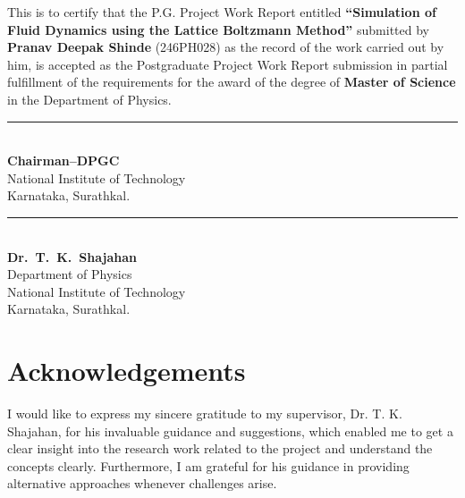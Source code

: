 \documentclass[12pt, a4paper]{report}
\begin{document}
\vspace{1.2cm}

\noindent
This is to certify that the P.G. Project Work Report entitled
\textbf{``Simulation of Fluid Dynamics using the Lattice Boltzmann Method''}
submitted by \textbf{Pranav Deepak Shinde} (246PH028) as the record of the work
carried out by him, is accepted as the Postgraduate Project Work Report
submission in partial fulfillment of the requirements for the award of the
degree of \textbf{Master of Science} in the Department of Physics.

\vspace{3.5cm}

\noindent
\begin{minipage}[t]{0.45\textwidth}
\centering
\rule{6cm}{0.4pt}\\
\vspace{0.3cm}
\textbf{Chairman--DPGC}\\
National Institute of Technology\\
Karnataka, Surathkal.
\end{minipage}
\hfill
\begin{minipage}[t]{0.45\textwidth}
\centering
\rule{6cm}{0.4pt}\\
\vspace{0.3cm}
\textbf{Dr.\ T.\ K.\ Shajahan}\\
Department of Physics\\
National Institute of Technology\\
Karnataka, Surathkal.
\end{minipage}

\clearpage
\addtocounter{page}{1}

\chapter*{Acknowledgements}

\vspace{1cm}

I would like to express my sincere gratitude to my supervisor, Dr. T. K. Shajahan, for his invaluable guidance and suggestions, which enabled me to get a clear insight into the research work related to the project and understand the concepts clearly. Furthermore, I am grateful for his guidance in providing alternative approaches whenever challenges arise.
\end{document}
